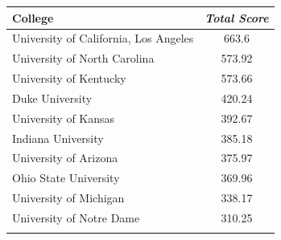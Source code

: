 \documentclass[10.5pt,a4paper,twocolumn]{article}
\begin{document}
\begin{table}[t]
\begin{tabular}{lc}
	\end{tabular}
	
	\begin{tabular}{lc}
		College & \textit{Total Score}  \\
		\hline
		University of California, Los Angeles & 663.6\\
		University of North Carolina & 573.92\\
		University of Kentucky & 573.66\\
		Duke University & 420.24\\
		University of Kansas & 392.67\\
		Indiana University & 385.18\\
		University of Arizona & 375.97\\
		Ohio State University & 369.96\\
		University of Michigan & 338.17\\
		University of Notre Dame & 310.25\\
		&\\
		
	\end{tabular}
	
\end{table}
\end{document}
